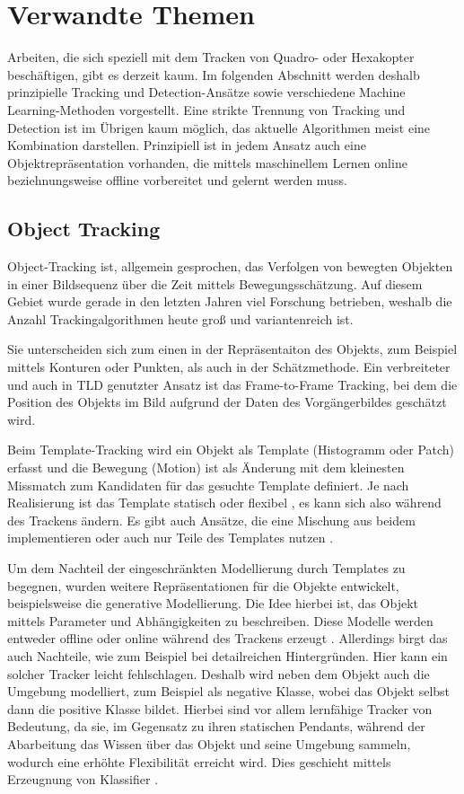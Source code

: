 \section {Verwandte Themen }
\label{section_2}
Arbeiten, die sich speziell mit dem Tracken von Quadro- oder Hexakopter beschäftigen, gibt es derzeit kaum. Im folgenden Abschnitt werden deshalb prinzipielle Tracking und Detection-Ansätze sowie verschiedene Machine Learning-Methoden vorgestellt. Eine strikte Trennung von Tracking und Detection ist im Übrigen kaum möglich, das aktuelle Algorithmen meist eine Kombination darstellen. Prinzipiell ist in jedem Ansatz auch eine Objektrepräsentation vorhanden, die mittels maschinellem Lernen online beziehnungsweise offline vorbereitet und gelernt werden muss.

\subsection{Object Tracking}
Object-Tracking ist, allgemein gesprochen, das Verfolgen von bewegten Objekten in einer Bildsequenz über die Zeit mittels Bewegungsschätzung. Auf diesem Gebiet wurde gerade in den letzten Jahren viel Forschung betrieben, weshalb die Anzahl Trackingalgorithmen heute groß und variantenreich ist.

Sie unterscheiden sich zum einen in der Repräsentaiton des Objekts, zum Beispiel mittels Konturen oder Punkten, als auch in der Schätzmethode. Ein verbreiteter und auch in TLD genutzter Ansatz ist das Frame-to-Frame Tracking, bei dem die Position des Objekts im Bild aufgrund der Daten des Vorgängerbildes geschätzt wird.

Beim Template-Tracking \cite{OPT}\cite{GFT}\cite{KBT} wird ein Objekt als Template (Histogramm oder Patch) erfasst und die Bewegung (Motion) ist als Änderung mit dem kleinesten Missmatch zum Kandidaten für das gesuchte Template definiert. Je nach Realisierung ist das Template statisch\cite{KBT} oder flexibel \cite{OPT}\cite{GFT}, es kann sich also während des Trackens ändern. Es gibt auch Ansätze, die eine Mischung aus beidem implementieren \cite{TUP}\cite{SMAT}\cite{RDT} oder auch nur Teile des Templates nutzen \cite{ROAM}\cite{RFT}.

Um dem Nachteil der eingeschränkten Modellierung durch Templates zu begegnen, wurden weitere Repräsentationen für die Objekte entwickelt, beispielsweise die generative Modellierung. Die Idee hierbei ist, das Objekt mittels Parameter und Abhängigkeiten zu beschreiben. Diese Modelle werden entweder offline \cite{ETR} oder online während des Trackens erzeugt \cite{RFT}\cite{VTD}. Allerdings birgt das auch Nachteile, wie zum Beispiel bei detailreichen Hintergründen. Hier kann ein solcher Tracker leicht fehlschlagen. Deshalb wird neben dem Objekt auch die Umgebung modelliert, zum Beispiel als negative Klasse, wobei das Objekt selbst dann die positive Klasse bildet. Hierbei sind vor allem lernfähige Tracker von Bedeutung, da sie, im Gegensatz zu ihren statischen Pendants, während der Abarbeitung das Wissen über das Objekt und seine Umgebung sammeln, wodurch eine erhöhte Flexibilität erreicht wird. Dies geschieht mittels Erzeugnung von Klassifier \cite{ONS}\cite{ENT}\cite{OBT}.

